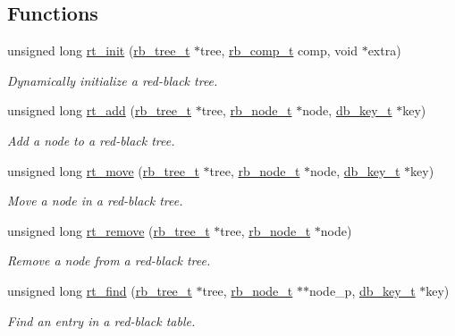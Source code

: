 \subsection*{Functions}
\begin{CompactItemize}
\item 
unsigned long \hyperlink{group__dbprim__rbtree_a5}{rt\_\-init} (\hyperlink{dbprim_8h_a0}{rb\_\-tree\_\-t} $\ast$tree, \hyperlink{dbprim_8h_a3}{rb\_\-comp\_\-t} comp, void $\ast$extra)
\begin{CompactList}\small\item\em Dynamically initialize a red-black tree. \item\end{CompactList}\item 
unsigned long \hyperlink{group__dbprim__rbtree_a6}{rt\_\-add} (\hyperlink{dbprim_8h_a0}{rb\_\-tree\_\-t} $\ast$tree, \hyperlink{dbprim_8h_a1}{rb\_\-node\_\-t} $\ast$node, \hyperlink{dbprim_8h_a0}{db\_\-key\_\-t} $\ast$key)
\begin{CompactList}\small\item\em Add a node to a red-black tree. \item\end{CompactList}\item 
unsigned long \hyperlink{group__dbprim__rbtree_a7}{rt\_\-move} (\hyperlink{dbprim_8h_a0}{rb\_\-tree\_\-t} $\ast$tree, \hyperlink{dbprim_8h_a1}{rb\_\-node\_\-t} $\ast$node, \hyperlink{dbprim_8h_a0}{db\_\-key\_\-t} $\ast$key)
\begin{CompactList}\small\item\em Move a node in a red-black tree. \item\end{CompactList}\item 
unsigned long \hyperlink{group__dbprim__rbtree_a8}{rt\_\-remove} (\hyperlink{dbprim_8h_a0}{rb\_\-tree\_\-t} $\ast$tree, \hyperlink{dbprim_8h_a1}{rb\_\-node\_\-t} $\ast$node)
\begin{CompactList}\small\item\em Remove a node from a red-black tree. \item\end{CompactList}\item 
unsigned long \hyperlink{group__dbprim__rbtree_a9}{rt\_\-find} (\hyperlink{dbprim_8h_a0}{rb\_\-tree\_\-t} $\ast$tree, \hyperlink{dbprim_8h_a1}{rb\_\-node\_\-t} $\ast$$\ast$node\_\-p, \hyperlink{dbprim_8h_a0}{db\_\-key\_\-t} $\ast$key)
\begin{CompactList}\small\item\em Find an entry in a red-black table. \item\end{CompactList}\item 
$$
\end{CompactItemize}
